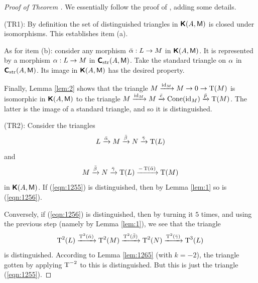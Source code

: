 \begin{proof}[Proof of Theorem \tup{\ref{thm:1255}}] 
We essentially follow the proof of \cite[Proposition 1.4.4]{KaSc1}, adding some
details.

\medskip \noindent
(TR1): By definition the set of distinguished triangles in 
$\boldsymbol{\mathsf{K}}(A, \operatorname{\mathsf{M}})$ is closed under isomorphisms. This establishes item (a). 

As for item (b): consider any morphism $\bar{\alpha} : L \to M$ in
$\boldsymbol{\mathsf{K}}(A, \operatorname{\mathsf{M}})$. It is represented by a morphism $\alpha : L \to M$ in 
$\boldsymbol{\mathsf{C}}_{\mathrm{str}}(A, \operatorname{\mathsf{M}})$. Take the standard triangle on $\alpha$ 
in $\boldsymbol{\mathsf{C}}_{\mathrm{str}}(A, \operatorname{\mathsf{M}})$. Its image in $\boldsymbol{\mathsf{K}}(A, \operatorname{\mathsf{M}})$
has the desired property. 

Finally, Lemma \ref{lem:2} shows that the triangle 
$M \xrightarrow{\operatorname{id}_M} M \to 0 \to \operatorname{T}(M)$ 
is isomorphic in $\boldsymbol{\mathsf{K}}(A, \operatorname{\mathsf{M}})$ to the triangle
$M \xrightarrow{\operatorname{id}_M} M \xrightarrow{\bar{e}} \operatorname{Cone}(\operatorname{id}_M) \xrightarrow{\bar{p}} 
\operatorname{T}(M)$.
The latter is the image of a standard triangle, and so it is distinguished.

\medskip \noindent
(TR2): Consider the triangles
\begin{equation} \label{eqn:1255}
L \xrightarrow{\bar{\alpha}} M \xrightarrow{\bar{\beta}} N \xrightarrow{\bar{\gamma}} \operatorname{T}(L)
\end{equation}
and
\begin{equation} \label{eqn:1256}
M \xrightarrow{\bar{\beta}} N \xrightarrow{\bar{\gamma}} \operatorname{T}(L)\xrightarrow{- \operatorname{T}(\bar{\alpha})} 
\operatorname{T}(M) 
\end{equation}
in $\boldsymbol{\mathsf{K}}(A, \operatorname{\mathsf{M}})$. If (\ref{eqn:1255}) is distinguished, then by 
Lemma \ref{lem:1} so is (\ref{eqn:1256}). 

Conversely, if (\ref{eqn:1256}) is distinguished, then by turning it $5$ times, 
and using the previous step (namely by Lemma \ref{lem:1}), we see that the 
triangle
\[ \operatorname{T}^2(L) \xrightarrow{\operatorname{T}^2(\bar{\alpha})} \operatorname{T}^2(M) 
\xrightarrow{\operatorname{T}^2(\bar{\beta})} \operatorname{T}^2(N) \xrightarrow{\operatorname{T}^2(\bar{\gamma})} 
\operatorname{T}^3(L) \]
is distinguished. 
According to Lemma \ref{lem:1265} (with $k = -2$), the triangle 
gotten by applying $\operatorname{T}^{-2}$ to this is distinguished.
But this is just the triangle (\ref{eqn:1255}).


\end{proof}
